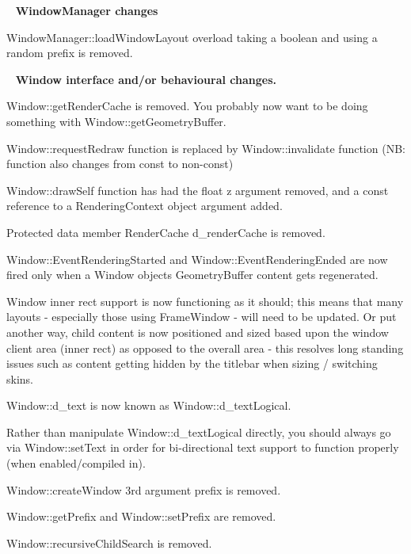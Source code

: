 ~\newline
 {\bfseries{Window\+Manager changes}}
\begin{DoxyItemize}
\item Window\+Manager\+::load\+Window\+Layout overload taking a boolean and using a random prefix is removed.
\end{DoxyItemize}

~\newline
 {\bfseries{Window interface and/or behavioural changes.}}
\begin{DoxyItemize}
\item {\ttfamily Window\+::get\+Render\+Cache} is removed. You probably now want to be doing something with Window\+::get\+Geometry\+Buffer.
\item {\ttfamily Window\+::request\+Redraw} function is replaced by Window\+::invalidate function (NB\+: function also changes from const to non-\/const)
\item Window\+::draw\+Self function has had the float z argument removed, and a const reference to a Rendering\+Context object argument added.
\item Protected data member Render\+Cache {\ttfamily d\+\_\+render\+Cache} is removed.
\item Window\+::\+Event\+Rendering\+Started and Window\+::\+Event\+Rendering\+Ended are now fired only when a Window object\textquotesingle{}s Geometry\+Buffer content gets regenerated.
\item Window \textquotesingle{}inner rect\textquotesingle{} support is now functioning as it should; this means that many layouts -\/ especially those using Frame\+Window -\/ will need to be updated. Or put another way, child content is now positioned and sized based upon the window client area (inner rect) as opposed to the overall area -\/ this resolves long standing issues such as content getting hidden by the titlebar when sizing / switching skins.
\item {\ttfamily Window\+::d\+\_\+text} is now known as Window\+::d\+\_\+text\+Logical.
\item Rather than manipulate Window\+::d\+\_\+text\+Logical directly, you should always go via Window\+::set\+Text in order for bi-\/directional text support to function properly (when enabled/compiled in).
\item Window\+::create\+Window 3rd argument {\ttfamily prefix} is removed.
\item {\ttfamily Window\+::get\+Prefix} and {\ttfamily Window\+::set\+Prefix} are removed.
\item {\ttfamily Window\+::recursive\+Child\+Search} is removed.

\end{DoxyItemize}
